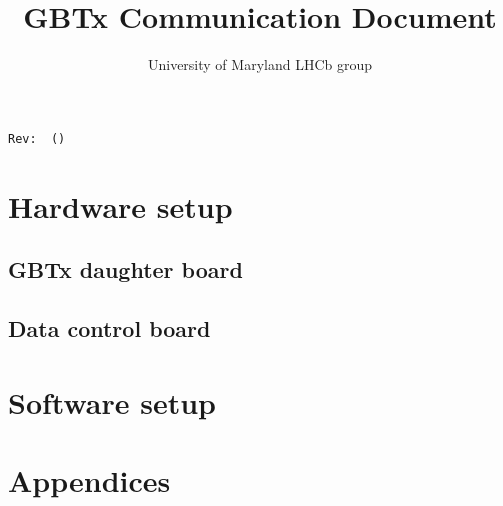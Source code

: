 \documentclass[11pt,letterpaper]{refart}
\title{GBTx Communication Document}
\author{University of Maryland LHCb group}
\begin{document}
\maketitle
\hfill\small{\texttt{Rev:~\gitRel~(\gitAbbrevHash)}}
\tableofcontents
\listoffigures
\clearpage

\section{Hardware setup}
\subsection{GBTx daughter board}







\subsection{Data control board}








\section{Software setup}







\newpage \appendix
\section*{Appendices}
\renewcommand{\thesubsection}{\Alph{subsection}}




\end{document}
